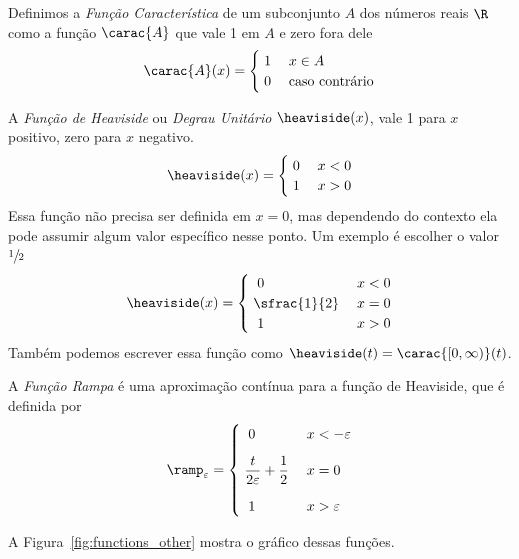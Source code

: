 Definimos a \emph{Função Característica}
de um subconjunto $A$ dos números reais $\R$ como a função $\carac{A}$ que vale 1
em $A$ e zero fora dele
\begin{equation}
  \label{eq:funcao_caracteristica}
  \carac{A}(x) = \begin{cases}
    \; 1 & \; x \in A \\
    \; 0 & \; \text{caso contrário}
  \end{cases}
\end{equation}

A \emph{Função de Heaviside}
ou \emph{Degrau Unitário}
$\heaviside(x)$, vale 1 para $x$ positivo, zero para $x$ negativo.
\begin{equation}
  \label{eq:funcao_heaviside}
  \heaviside(x) = \begin{cases}
    \; 0 & \; x < 0 \\
    \; 1 & \; x > 0
  \end{cases}
\end{equation}
Essa função não precisa ser definida em $x=0$, mas dependendo do contexto
ela pode assumir algum valor específico nesse ponto. Um exemplo é
escolher o valor $\sfrac{1}{2}$
\[
  \heaviside(x) = \begin{cases}
    \;\; 0          & \; x < 0 \\
    \; \sfrac{1}{2} & \; x = 0 \\
    \;\; 1          & \; x > 0
  \end{cases}
\]
Também podemos escrever essa função como \(\heaviside(t) = \carac{[0, \infty)}(t)\).

A \emph{Função Rampa} é uma aproximação contínua para a
função de Heaviside, que é definida por
\begin{equation}
  \label{eq:funcao_rampa}
  \ramp_\varepsilon = \begin{cases}
    \;\; 0                                 & \; x < - \varepsilon \\[3mm]
    \; \dfrac{t}{2\varepsilon} + \dfrac{1}{2} & \; x = 0          \\[4mm]
    \;\; 1                                 & \; x > \varepsilon
  \end{cases}
\end{equation}

A Figura~\ref{fig:functions_other} mostra o gráfico dessas funções.

